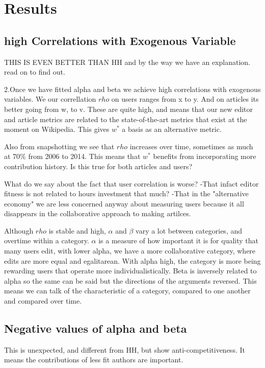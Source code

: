 \documentclass{acm_proc_article-sp}
\begin{document}
\section{Results}


\subsection{high Correlations with Exogenous Variable}

THIS IS EVEN BETTER THAN HH
and by the way we have an explanation. read on to find out.

2.Once we have fitted alpha and beta we achieve high correlations with exogenous variables. We our correllation $rho$ 
 on users ranges from x to y. And on articles its better going from w, to v. These are quite high, and means that our new editor and article metrics are related to the state-of-the-art metrics that exist at the moment on Wikipedia. This gives $w^*$ a basis as an alternative metric. 
 
 Also from snapshotting we see that $rho$ increases over time, sometimes as much at 70\% from 2006 to 2014. This means that $w^*$ benefits from incorporating more contribution history.
Is this true for both articles and users?

What do we say about the fact that user correlation is worse?
-That infact editor fitness is not related to hours investment that much?
-That in the "alternative economy" we are less concerned anyway about measuring users because it all disappears in the collaborative approach to making artilces. 
 
Although $rho$ is stable and high, $\alpha$ and $\beta$ vary a lot between categories, and overtime within a category. $\alpha$ is a measure of how important it is for quality that many users edit, with lower alpha, we have a more collaborative category, where edits are more equal and egalitarean. With alpha high, the category is more being rewarding users that operate more individualistically. Beta is inversely related to alpha so the same can be said but the directions of the arguments reversed. This means we can talk of the characteristic of a category, compared to one another and compared over time. 

\subsection{Negative values of alpha and beta}
This is unexpected, and different from HH, but show anti-competitiveness. It means the contributions of less fit authors are important.
\end{document}

